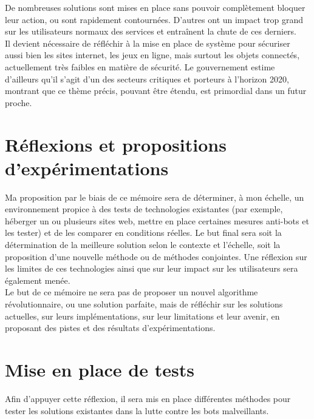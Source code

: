 \documentclass[12pt,a4paper,oldfontcommands]{memoir}
\begin{document}
De nombreuses solutions sont mises en place sans pouvoir complètement bloquer leur action, ou sont rapidement contournées. D'autres ont un impact trop grand sur les utilisateurs normaux des services et entraînent la chute de ces derniers. \\

Il devient nécessaire de réfléchir à la mise en place de système pour sécuriser aussi bien les sites internet, les jeux en ligne, mais surtout les objets connectés, actuellement très faibles en matière de sécurité. Le gouvernement estime d'ailleurs qu'il s'agit d'un des secteurs critiques et porteurs à l'horizon 2020, montrant que ce thème précis, pouvant être étendu, est primordial dans un futur proche.\\


\section*{Réflexions et propositions d'expérimentations}

Ma proposition par le biais de ce mémoire sera de déterminer, à mon échelle, un environnement propice à des tests de technologies existantes (par exemple, héberger un ou plusieurs sites web, mettre en place certaines mesures anti-bots et les tester) et de les comparer en conditions réelles. Le but final sera soit la détermination de la meilleure solution selon le contexte et l'échelle, soit la proposition d'une nouvelle méthode ou de méthodes conjointes. Une réflexion sur les limites de ces technologies ainsi que sur leur impact sur les utilisateurs sera également menée.\\

Le but de ce mémoire ne sera pas de proposer un nouvel algorithme révolutionnaire, ou une solution parfaite, mais de réfléchir sur les solutions actuelles, sur leurs implémentations, sur leur limitations et leur avenir, en proposant des pistes et des résultats d'expérimentations.

\section*{Mise en place de tests}
Afin d'appuyer cette réflexion, il sera mis en place différentes méthodes pour tester les solutions existantes dans la lutte contre les bots malveillants.\\
\end{document}
